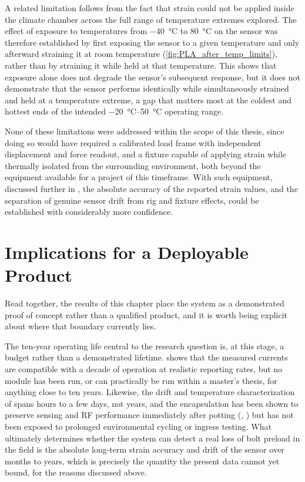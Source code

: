 A related limitation follows from the fact that strain could not be applied inside the climate chamber across the full range of temperature extremes explored. The effect of exposure to temperatures from \SI{-40}{\celsius} to \SI{80}{\celsius} on the sensor was therefore established by first exposing the sensor to a given temperature and only afterward straining it at room temperature (\cref{fig:PLA_after_temp_limits}), rather than by straining it while held at that temperature. This shows that exposure alone does not degrade the sensor's subsequent response, but it does not demonstrate that the sensor performs identically while simultaneously strained and held at a temperature extreme, a gap that matters most at the coldest and hottest ends of the intended \SIrange{-20}{50}{\celsius} operating range.

None of these limitations were addressed within the scope of this thesis, since doing so would have required a calibrated load frame with independent displacement and force readout, and a fixture capable of applying strain while thermally isolated from the surrounding environment, both beyond the equipment available for a project of this timeframe. With such equipment, discussed further in , the absolute accuracy of the reported strain values, and the separation of genuine sensor drift from rig and fixture effects, could be established with considerably more confidence.

\section{Implications for a Deployable Product}
Read together, the results of this chapter place the system as a demonstrated proof of concept rather than a qualified product, and it is worth being explicit about where that boundary currently lies.

The ten-year operating life central to the research question is, at this stage, a budget rather than a demonstrated lifetime.  shows that the measured currents are compatible with a decade of operation at realistic reporting rates, but no module has been run, or can practically be run within a master's thesis, for anything close to ten years. Likewise, the drift and temperature characterization of  spans hours to a few days, not years, and the encapsulation has been shown to preserve sensing and RF performance immediately after potting (, ) but has not been exposed to prolonged environmental cycling or ingress testing. What ultimately determines whether the system can detect a real loss of bolt preload in the field is the absolute long-term strain accuracy and drift of the sensor over months to years, which is precisely the quantity the present data cannot yet bound, for the reasons discussed above.

